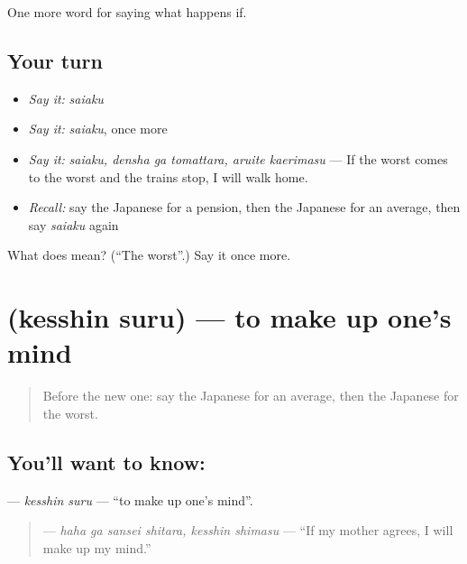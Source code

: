 \begin{grammarlens}[title={What you've built}]
One more word for saying what happens if.
\end{grammarlens}

\subsection*{Your turn}
\begin{itemize}
\raggedright
  \item \emph{Say it:} \emph{saiaku}
  \item \emph{Say it:} \emph{saiaku}, once more
  \item \emph{Say it:} \emph{saiaku, densha ga tomattara, aruite kaerimasu} — If the worst comes to the worst and the trains stop, I will walk home.
  \item \emph{Recall:} say the Japanese for a pension, then the Japanese for an average, then say \emph{saiaku} again
\end{itemize}

\begin{tcolorbox}[breakable,colback=teal!4,colframe=teal!35!black,title={Before you move on}]
What does  mean? (\textquotedblleft{}The worst\textquotedblright{}.) Say it once more.
\end{tcolorbox}
\section[\texorpdfstring{\ja{けっしんする} (kesshin suru)}{けっしんする (kesshin suru)}]{ (kesshin suru) — to make up one's mind}

\label{lesson:JA-C366-kesshin-suru}



\begin{quote}
Before the new one: say the Japanese for an average, then the Japanese for the worst.
\end{quote}

\subsection*{You'll want to know: }
\textbf{} — \emph{kesshin suru} — \textquotedblleft{}to make up one's mind\textquotedblright{}.

\begin{quote}
\textbf{ } — \emph{haha ga sansei shitara, kesshin shimasu} — \textquotedblleft{}If my mother agrees, I will make up my mind.\textquotedblright{}
\end{quote}

